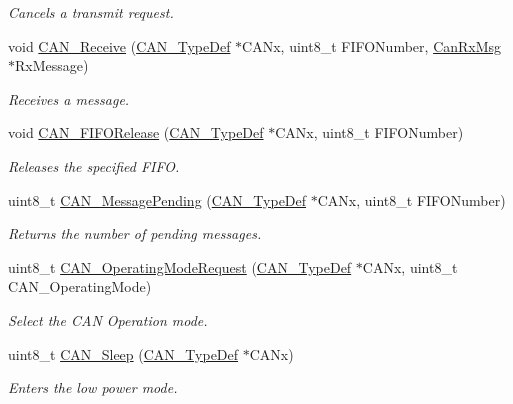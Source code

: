 \begin{DoxyCompactItemize}
\begin{DoxyCompactList}\small\item\em Cancels a transmit request. \end{DoxyCompactList}\item 
void \hyperlink{group___c_a_n___exported___functions_ga351b90bb8a3bb0c846f85bbd56ef4dc8}{C\+A\+N\+\_\+\+Receive} (\hyperlink{struct_c_a_n___type_def}{C\+A\+N\+\_\+\+Type\+Def} $\ast$C\+A\+Nx, uint8\+\_\+t F\+I\+F\+O\+Number, \hyperlink{struct_can_rx_msg}{Can\+Rx\+Msg} $\ast$Rx\+Message)
\begin{DoxyCompactList}\small\item\em Receives a message. \end{DoxyCompactList}\item 
void \hyperlink{group___c_a_n___exported___functions_ga1bc3b39471e579b4101624c33d27918b}{C\+A\+N\+\_\+\+F\+I\+F\+O\+Release} (\hyperlink{struct_c_a_n___type_def}{C\+A\+N\+\_\+\+Type\+Def} $\ast$C\+A\+Nx, uint8\+\_\+t F\+I\+F\+O\+Number)
\begin{DoxyCompactList}\small\item\em Releases the specified F\+I\+FO. \end{DoxyCompactList}\item 
uint8\+\_\+t \hyperlink{group___c_a_n___exported___functions_ga7100459a95ce1b3cfe8ab15e112029fe}{C\+A\+N\+\_\+\+Message\+Pending} (\hyperlink{struct_c_a_n___type_def}{C\+A\+N\+\_\+\+Type\+Def} $\ast$C\+A\+Nx, uint8\+\_\+t F\+I\+F\+O\+Number)
\begin{DoxyCompactList}\small\item\em Returns the number of pending messages. \end{DoxyCompactList}\item 
uint8\+\_\+t \hyperlink{group___c_a_n___exported___functions_gab2a3630e9e3024114eb117d14e514208}{C\+A\+N\+\_\+\+Operating\+Mode\+Request} (\hyperlink{struct_c_a_n___type_def}{C\+A\+N\+\_\+\+Type\+Def} $\ast$C\+A\+Nx, uint8\+\_\+t C\+A\+N\+\_\+\+Operating\+Mode)
\begin{DoxyCompactList}\small\item\em Select the C\+AN Operation mode. \end{DoxyCompactList}\item 
uint8\+\_\+t \hyperlink{group___c_a_n___exported___functions_ga640215e38765759d7eceb8a039046667}{C\+A\+N\+\_\+\+Sleep} (\hyperlink{struct_c_a_n___type_def}{C\+A\+N\+\_\+\+Type\+Def} $\ast$C\+A\+Nx)
\begin{DoxyCompactList}\small\item\em Enters the low power mode. \end{DoxyCompactList}\item 

\end{DoxyCompactItemize}
